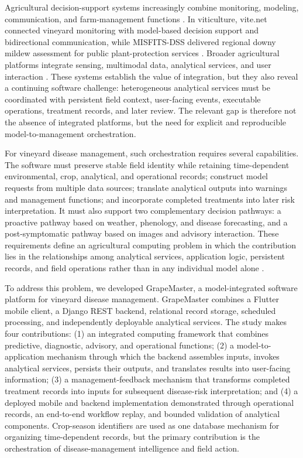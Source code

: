 \documentclass[12pt]{article}
\begin{document}
Agricultural decision-support systems increasingly combine monitoring, modeling, communication, and farm-management functions \citep{fountasFarmManagementInformation2015,zhaiDecisionSupportSystems2020}. In viticulture, vite.net connected vineyard monitoring with model-based decision support and bidirectional communication, while MISFITS-DSS delivered regional downy mildew assessment for public plant-protection services \citep{rossiAddressingImplementationProblem2014,bregaglioPublicDecisionSupport2022}. Broader agricultural platforms integrate sensing, multimodal data, analytical services, and user interaction \citep{bakirScalableEndtoendIoT2026,chenAgriculturalAutonomousDecisionmaking2026}. These systems establish the value of integration, but they also reveal a continuing software challenge: heterogeneous analytical services must be coordinated with persistent field context, user-facing events, executable operations, treatment records, and later review. The relevant gap is therefore not the absence of integrated platforms, but the need for explicit and reproducible model-to-management orchestration.

For vineyard disease management, such orchestration requires several capabilities. The software must preserve stable field identity while retaining time-dependent environmental, crop, analytical, and operational records; construct model requests from multiple data sources; translate analytical outputs into warnings and management functions; and incorporate completed treatments into later risk interpretation. It must also support two complementary decision pathways: a proactive pathway based on weather, phenology, and disease forecasting, and a post-symptomatic pathway based on images and advisory interaction. These requirements define an agricultural computing problem in which the contribution lies in the relationships among analytical services, application logic, persistent records, and field operations rather than in any individual model alone \citep{mccownLocatingAgriculturalDecision2002,roseDecisionSupportTools2016,romera2024digitalization}.

To address this problem, we developed GrapeMaster, a model-integrated software platform for vineyard disease management. GrapeMaster combines a Flutter mobile client, a Django REST backend, relational record storage, scheduled processing, and independently deployable analytical services. The study makes four contributions: (1) an integrated computing framework that combines predictive, diagnostic, advisory, and operational functions; (2) a model-to-application mechanism through which the backend assembles inputs, invokes analytical services, persists their outputs, and translates results into user-facing information; (3) a management-feedback mechanism that transforms completed treatment records into inputs for subsequent disease-risk interpretation; and (4) a deployed mobile and backend implementation demonstrated through operational records, an end-to-end workflow replay, and bounded validation of analytical components. Crop-season identifiers are used as one database mechanism for organizing time-dependent records, but the primary contribution is the orchestration of disease-management intelligence and field action.
\end{document}
